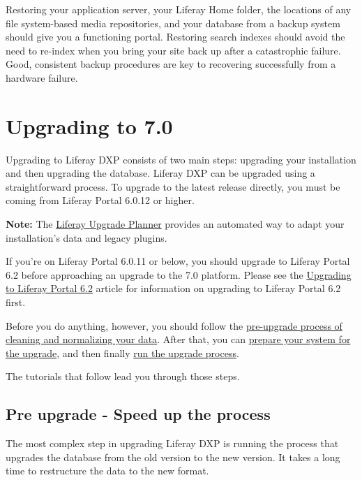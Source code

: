 Restoring your application server, your Liferay Home folder, the
locations of any file system-based media repositories, and your database
from a backup system should give you a functioning portal. Restoring
search indexes should avoid the need to re-index when you bring your
site back up after a catastrophic failure. Good, consistent backup
procedures are key to recovering successfully from a hardware failure.

\chapter{Upgrading to 7.0}\label{upgrading-to-7.0}

Upgrading to Liferay DXP consists of two main steps: upgrading your
installation and then upgrading the database. Liferay DXP can be
upgraded using a straightforward process. To upgrade to the latest
release directly, you must be coming from Liferay Portal 6.0.12 or
higher.

\noindent\hrulefill

\textbf{Note:} The
\href{/docs/7-0/tutorials/-/knowledge_base/t/liferay-upgrade-planner}{Liferay
Upgrade Planner} provides an automated way to adapt your installation's
data and legacy plugins.

\noindent\hrulefill

If you're on Liferay Portal 6.0.11 or below, you should upgrade to
Liferay Portal 6.2 before approaching an upgrade to the 7.0 platform.
Please see the
\href{/docs/6-2/deploy/-/knowledge_base/d/upgrading-liferay}{Upgrading
to Liferay Portal 6.2} article for information on upgrading to Liferay
Portal 6.2 first.

Before you do anything, however, you should follow the
\href{/docs/7-0/deploy/-/knowledge_base/d/pre-upgrade-speed-up-the-process}{pre-upgrade
process of cleaning and normalizing your data}. After that, you can
\href{/docs/7-0/deploy/-/knowledge_base/d/preparing-an-upgrade-to-liferay-7}{prepare
your system for the upgrade}, and then finally
\href{/docs/7-0/deploy/-/knowledge_base/d/running-the-upgrade-process}{run
the upgrade process}.

The tutorials that follow lead you through those steps.

\section{Pre upgrade - Speed up the
process}\label{pre-upgrade---speed-up-the-process}

The most complex step in upgrading Liferay DXP is running the process
that upgrades the database from the old version to the new version. It
takes a long time to restructure the data to the new format.

